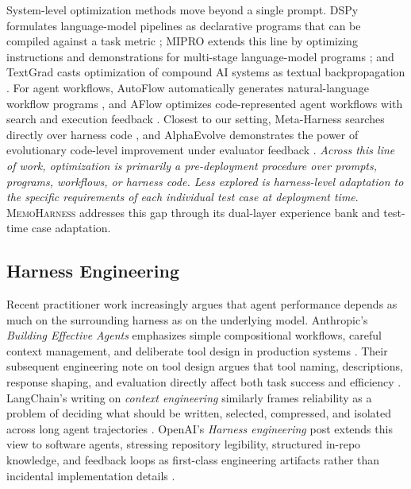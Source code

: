 \documentclass{article}
\newcommand{\method}{\textsc{MemoHarness}\xspace}
\begin{document}
System-level optimization methods move beyond a single prompt. DSPy formulates
language-model pipelines as declarative programs that can be compiled against a
task metric \citep{khattab2023dspy}; MIPRO extends this line by optimizing
instructions and demonstrations for multi-stage language-model programs
\citep{opsahlong2024mipro}; and TextGrad casts optimization of compound AI
systems as textual backpropagation \citep{yuksekgonul2024textgrad}. For agent
workflows, AutoFlow automatically generates natural-language workflow programs
\citep{li2024autoflow}, and AFlow optimizes code-represented agent workflows
with search and execution feedback \citep{zhang2024aflow}. Closest to our
setting, Meta-Harness searches directly over harness code
\citep{lee2026metaharness}, and AlphaEvolve demonstrates the power of
evolutionary code-level improvement under evaluator feedback
\citep{novikov2025alphaevolve}.
\emph{Across this line of work, optimization is primarily a pre-deployment
procedure over prompts, programs, workflows, or harness code. Less explored is
harness-level adaptation to the specific requirements of each individual test
case at deployment time}. \method addresses this gap through its
dual-layer experience bank and test-time case adaptation.

\subsection{Harness Engineering}
\label{sec:related_harness}

Recent practitioner work increasingly argues that agent performance depends as
much on the surrounding harness as on the underlying model. Anthropic's
\emph{Building Effective Agents} emphasizes simple compositional workflows,
careful context management, and deliberate tool design in production systems
\citep{anthropic2024effectiveagents}. Their subsequent engineering note on tool
design argues that tool naming, descriptions, response shaping, and evaluation
directly affect both task success and efficiency \citep{anthropic2025tools}.
LangChain's writing on \emph{context engineering} similarly frames reliability
as a problem of deciding what should be written, selected, compressed, and
isolated across long agent trajectories \citep{langchain2025context}. OpenAI's
\emph{Harness engineering} post extends this view to software agents, stressing
repository legibility, structured in-repo knowledge, and feedback loops as
first-class engineering artifacts rather than incidental implementation details
\citep{lopopolo2026harness}.
\end{document}
